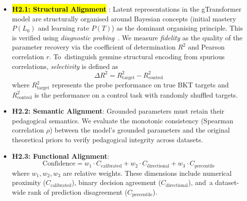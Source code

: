 \documentclass[applsci,article,accept,moreauthors,pdftex]{Definitions/mdpi}
\begin{document}
\begin{itemize}
    \item {\textbf{\hl{H2.1: Structural Alignment}%
}: Latent representations in the gTransformer model are structurally organised around Bayesian concepts (initial mastery $P(L_0)$ and learning rate $P(T)$) as the dominant organising principle. This is verified using \textit{diagnostic probing}~\citep{hewitt2019designing, belinkov2022probing}. We measure \textit{fidelity} as the quality of the parameter recovery via the coefficient of determination $R^2$ and Pearson correlation $r$. To~distinguish genuine structural encoding from spurious correlations, \textit{selectivity} is defined as}
\begin{equation} \label{eq:selectivity}
    \Delta R^2 = R^2_{\text{target}} - R^2_{\text{control}}
    \end{equation}
    {where $R^2_{\text{target}}$ represents the probe performance on true BKT targets and $R^2_{\text{control}}$ is the performance on a control task with randomly shuffled targets.}
    \item {\textbf{H2.2: Semantic Alignment}: Grounded parameters must retain their pedagogical semantics. We evaluate the monotonic consistency (Spearman correlation $\rho$) between the model's grounded parameters and the original theoretical priors to verify pedagogical integrity across datasets.}
    \item {\textbf{H2.3: Functional Alignment}: }
\begin{equation} \label{eq:confidence}
    \text{Confidence} = w_1 \cdot C_{\text{calibrated}} + w_2 \cdot C_{\text{directional}} + w_3 \cdot C_{\text{percentile}}
    \end{equation}
    {where $w_1, w_2, w_3$ are relative weights. These dimensions include numerical proximity ($C_{\text{calibrated}}$), binary decision agreement ($C_{\text{directional}}$), and~a dataset-wide rank of prediction disagreement ($C_{\text{percentile}}$).}
\end{itemize}


\subsubsection{{}} %
\end{document}
